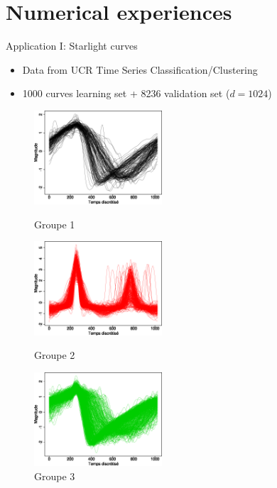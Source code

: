 \documentclass[xcolor=dvipsnames, smaller]{beamer}
\begin{document}
\section{Numerical experiences}


\begin{frame}{Application I: Starlight curves}

\begin{itemize}
 \item Data from UCR Time Series Classification/Clustering
 \item 1000 curves learning set + 8236 validation set ($d= 1024$)%
\end{itemize}

\begin{figure}[H]
\begin{minipage}[c]{.32\linewidth}
	\includegraphics[width=\linewidth,height=3.5cm]{pics/slgr1.png}
	\caption{Groupe 1}
\end{minipage}
\begin{minipage}[c]{.32\linewidth}
	\includegraphics[width=\linewidth,height=3.5cm]{pics/slgr2.png}
	\caption{Groupe 2}
\end{minipage}
\begin{minipage}[c]{.32\linewidth}
	\includegraphics[width=\linewidth,height=3.5cm]{pics/slgr3.png}
	\caption{Groupe 3}
\end{minipage}
\label{figsltr3clusts}
\end{figure}


\end{frame}
\end{document}
